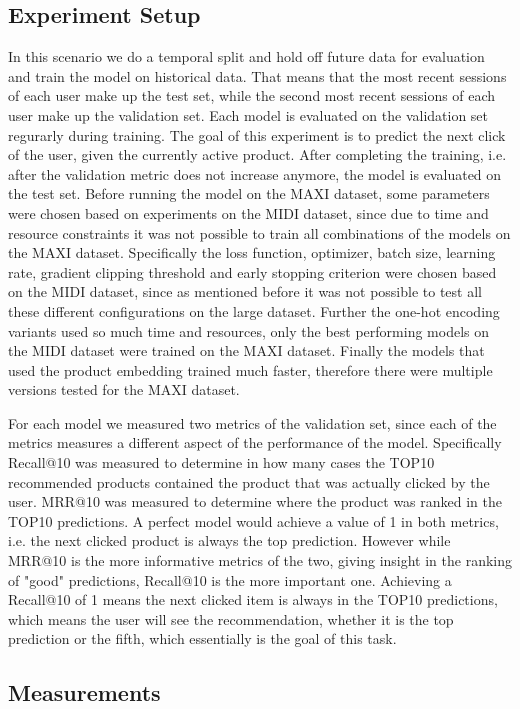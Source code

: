 \subsection{Experiment Setup}\label{sec:exp_setup}
In this scenario we do a temporal split and hold off future data for evaluation and train the model on historical data.
That means that the most recent sessions of each user make up the test set, while the second most recent sessions of each user make up the validation set.
Each model is evaluated on the validation set regurarly during training.
The goal of this experiment is to predict the next click of the user, given the currently active product.
After completing the training, i.e. after the validation metric does not increase anymore, the model is evaluated on the test set.
Before running the model on the MAXI dataset, some parameters were chosen based on experiments on the MIDI dataset, since due to time and resource constraints it was not possible to train all combinations of the models on the MAXI dataset.
Specifically the loss function, optimizer, batch size, learning rate, gradient clipping threshold and early stopping criterion were chosen based on the MIDI dataset, since as mentioned before it was not possible to test all these different configurations on the large dataset.
Further the one-hot encoding variants used so much time and resources, only the best performing models on the MIDI dataset were trained on the MAXI dataset.
Finally the models that used the product embedding trained much faster, therefore there were multiple versions tested for the MAXI dataset.
\par
For each model we measured two metrics of the validation set, since each of the metrics measures a different aspect of the performance of the model.
Specifically Recall@10 was measured to determine in how many cases the TOP10 recommended products contained the product that was actually clicked by the user.
MRR@10 was measured to determine where the product was ranked in the TOP10 predictions.
A perfect model would achieve a value of 1 in both metrics, i.e. the next clicked product is always the top prediction.
However while MRR@10 is the more informative metrics of the two, giving insight in the ranking of "good" predictions, Recall@10 is the more important one.
Achieving a Recall@10 of 1 means the next clicked item is always in the TOP10 predictions, which means the user will see the recommendation, whether it is the top prediction or the fifth, which essentially is the goal of this task.
\subsection{Measurements}


